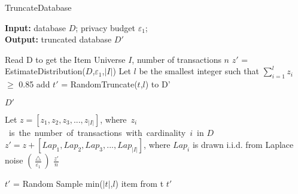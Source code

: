 \documentclass{article}
\begin{document}
\begin{algorithm}[t]
    \caption{TruncateDatabase} %
    \hspace*{0.02in} {\bf Input:} %
    database $D$; privacy budget $\varepsilon_1$;\\
    \hspace*{0.02in} {\bf Output:} %
    truncated database $D'$
    
    \begin{algorithmic}[1]
    \State Read D to get the Item Universe $I$, number of transactions $n$
    \State $z'$ = {EstimateDistribution}{($D$,$\varepsilon_1$,$|I|$)}
    \State Let $l$ be the smallest integer such that  $\sum_{i=1}^l$$z_i$ $\ge$ 0.85
        \State add $t'$ = RandomTruncate($t$,$l$) to D'
    \EndFor 

    \State \Return $D'$

     
    \State Let $z = [ z_1, z_2, z_3,...,z_{|I|}]$, 
    where\ $z_i$\ is\ the\ number\ of\ transactions\ with\ cardinality\ $i$\ in $D$
    \State $z' = z + [Lap_1,Lap_2,Lap_3,...,Lap_{|I|}]$, where $Lap_i$ is drawn i.i.d. from Laplace noise $(\frac{\bigtriangleup}{\varepsilon_1})$
    \State \Return $\frac{z'}{n}$
    \EndFunction

    \State $t'$ = Random Sample min({$|t|$,$l$}) item from t
    \State \Return $t'$
    \EndFunction    

    
    \end{algorithmic}
    
\end{algorithm}
\end{document}
